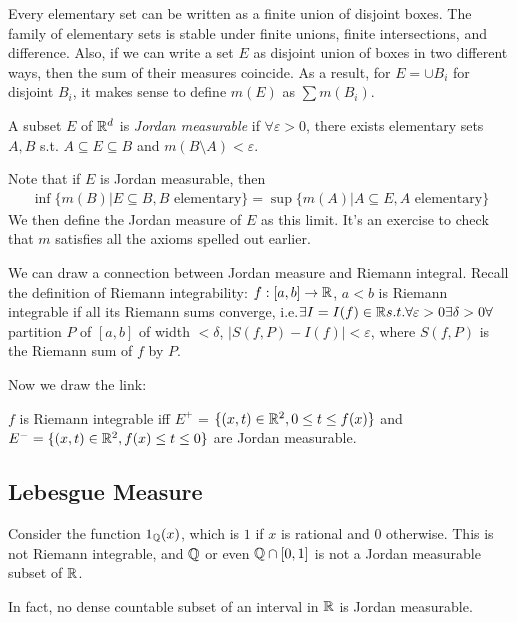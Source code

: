 \documentclass[a4paper]{article}
\begin{document}
\begin{rem}
Every elementary set can be written as a finite union of disjoint boxes. The family of elementary sets is stable under finite unions, finite intersections, and difference. Also, if we can write a set $E$ as disjoint union of boxes in two different ways, then the sum of their measures coincide. As a result, for $E=\cup B_i$ for disjoint $B_i$, it makes sense to define $m(E)$ as $\sum m(B_i)$.
\end{rem}

\begin{defi}
A subset $E$ of $\mathbb{R}^d$ is \emph{Jordan measurable} if $\forall \varepsilon>0$, there exists elementary sets $A,B$ s.t. $A \subseteq E \subseteq B$ and $m(B\setminus A) < \varepsilon$.
\end{defi}

Note that if $E$ is Jordan measurable, then
\begin{equation*}
\begin{aligned}
\inf \{ m(B) | E \subseteq B, B \text{ elementary} \} = \sup \{ m(A) | A \subseteq E, A \text{ elementary} \}
\end{aligned}
\end{equation*}
We then define the Jordan measure of $E$ as this limit. It's an exercise to check that $m$ satisfies all the axioms spelled out earlier.

We can draw a connection between Jordan measure and Riemann integral. Recall the definition of Riemann integrability: $f:[a,b]\to\mathbb{R}$, $a<b$ is Riemann integrable if  all its Riemann sums converge, i.e.$\exists I = I(f) \in \mathbb{R} s.t. \forall \varepsilon>0 \exists \delta > 0 \forall$ partition $P$ of $[a,b]$ of width $<\delta$, $|S(f,P)-I(f)|<\varepsilon$, where $S(f,P)$ is the Riemann sum of $f$ by $P$.

Now we draw the link:

\begin{prop}
$f$ is Riemann integrable iff $E^+$ = $\{(x,t) \in \mathbb{R}^2, 0 \leq t \leq f(x)\}$ and $E^- = \{(x,t) \in \mathbb{R}^2, f(x) \leq t \leq 0\}$ are Jordan measurable.
\end{prop}

\subsection{Lebesgue Measure}

\begin{eg}
Consider the function $1_{\mathbb{Q}} (x)$, which is $1$ if $x$ is rational and $0$ otherwise. This is not Riemann integrable, and $\mathbb{Q}$ or even $\mathbb{Q} \cap [0,1]$ is not a Jordan measurable subset of $\mathbb{R}$.

In fact, no dense countable subset of an interval in $\mathbb{R}$ is Jordan measurable.
\end{eg}
\end{document}
